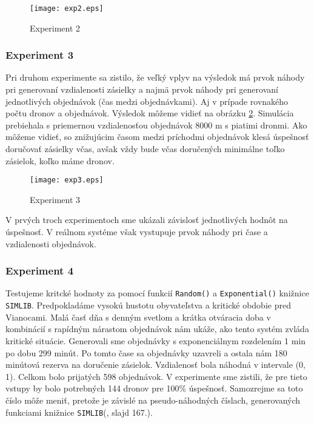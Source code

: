 \documentclass[czech, 12pt, a4paper]{article}
\begin{document}
\newpage
\begin{figure}[h!]
	\texttt{[image: exp2.eps]}
	\caption{Experiment 2}
	\label{fig:exp2}
\end{figure}

\subsubsection{Experiment 3}

Pri druhom experimente sa zistilo, že veľký vplyv na výsledok má prvok náhody pri generovaní vzdialenosti zásielky a najmä prvok náhody pri generovaní jednotlivých objednávok (čas medzi objednávkami). Aj v prípade rovnakého počtu dronov a objednávok. Výsledok môžeme vidieť na obrázku \ref{fig:exp3}. Simulácia prebiehala s priemernou vzdialenosťou objednávok 8000 m s piatimi dronmi. Ako môžeme vidieť, so znižujúcim časom medzi príchodmi objednávok klesá úspešnosť doručovať zásielky včas, avšak vždy bude včas doručených minimálne toľko zásielok, koľko máme dronov.

\begin{figure}[h!]
	\texttt{[image: exp3.eps]}
	\caption{Experiment 3}
	\label{fig:exp3}
\end{figure}

V prvých troch experimentoch sme ukázali závislosť jednotlivých hodnôt na úspešnosť. V reálnom systéme však vystupuje prvok náhody pri čase a vzdialenosti objednávok.

\subsubsection{Experiment 4}

Testujeme kritcké hodnoty za pomocí funkcií \texttt{Random()} a \texttt{Exponential()} knižnice \texttt{SIMLIB}. Predpokladáme vysokú hustotu obyvateľstva a kritické obdobie pred Vianocami. Malá časť dňa s denným svetlom a krátka otváracia doba v kombinácií s rapídným nárastom objednávok nám ukáže, ako tento systém zvláda kritické situácie.
Generovali sme objednávky s exponenciálnym rozdelením 1 min po dobu 299 minút. Po tomto čase sa objednávky uzavreli a ostala nám 180 minútová rezerva na doručenie zásielok. Vzdialenosť bola náhodná v intervale (0, 1). Celkom bolo prijatých 598 objednávok. V experimente sme zistili, že pre tieto vstupy by bolo potrebných 144 dronov pre 100\% úspešnosť. Samozrejme sa toto číslo môže meniť, pretože je závislé na pseudo-náhodných číslach, generovaných funkciami knižnice \texttt{SIMLIB}(\cite{prednasky}, slajd 167.).
\end{document}
